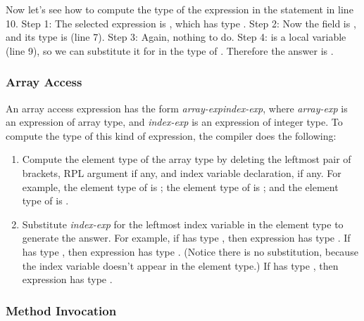 Now let's see how to compute the type of the expression in the
 statement in line 10.  Step 1: The selected expression is
, which has type .  Step 2: Now
the field is , and its type is
 (line 7).  Step 3: Again, nothing to
do.  Step 4:  is a  local variable (line 9), so we
can substitute it for  in the type of .
Therefore the answer is .

\subsubsection{Array Access%
\label{sec:types:exp:array}}

An array access expression has the form
\emph{array-exp}\kwd{[}\emph{index-exp}\kwd{]}, where \emph{array-exp}
is an expression of array type, and \emph{index-exp} is an expression
of integer type.  To compute the type of this kind of expression, the
compiler does the following:
%
\begin{enumerate}
%
\item Compute the element type of the array type by deleting the
  leftmost pair of brackets, RPL argument if any, and index variable
  declaration, if any.  For example, the element type of
   is ; the element type of
   is ; and the element type of
   is .
%
\item Substitute \emph{index-exp} for the leftmost index variable in
  the element type to generate the answer.  For example, if 
  has type , then expression  has
  type .  If  has type ,
  then expression  has type .  (Notice there
  is no substitution, because the index variable doesn't appear in the
  element type.)  If  has type
  , then expression  has
  type .
\end{enumerate}

\subsubsection{Method Invocation%
\label{sec:types:exp:invoke}}

